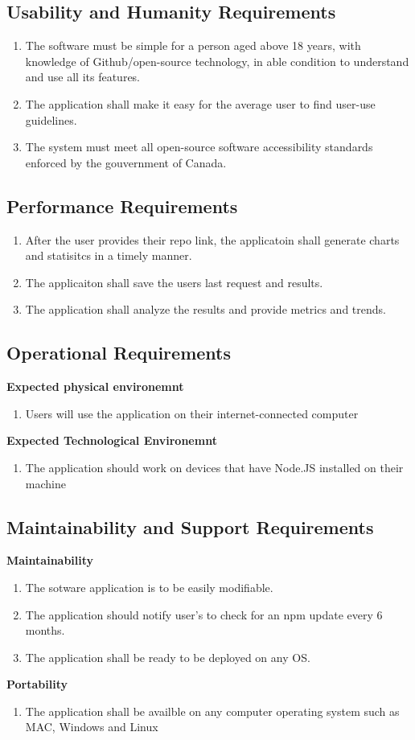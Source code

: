 \documentclass{article}
\begin{document}
\subsection{Usability and Humanity Requirements}
\begin{enumerate}
\item The software must be simple for a person aged above 18 years, with knowledge of Github/open-source technology, in able condition to understand and use all its features.
\item The application shall make it easy for the average user to find user-use guidelines.
\item The system must meet all open-source software accessibility standards enforced by the gouvernment of Canada. 
\end{enumerate}
\subsection{Performance Requirements}
\begin{enumerate}
\item After the user provides their repo link, the applicatoin shall generate charts and statisitcs in a timely manner. 
\item The applicaiton shall save the users last request and results. 
\item The application shall analyze the results and provide metrics and trends. 
\end{enumerate}
\subsection{Operational Requirements}
\textbf{Expected physical environemnt }
\begin{enumerate}
\item Users will use the application on their internet-connected computer 
\end{enumerate}
\textbf{Expected Technological Environemnt }
\begin{enumerate}
\item The application should work on devices that have Node.JS installed on their machine 
\end{enumerate}
\subsection{Maintainability and Support Requirements}
\textbf{Maintainability} 
\begin{enumerate}
\item The sotware application is to be easily modifiable.
\item The application should notify user's to check for an npm update every 6 months. 
\item The application shall be ready to be deployed on any OS. 
\end{enumerate}
\textbf{Portability} 
\begin{enumerate}
\item The application shall be availble on any computer operating system such as MAC, Windows and Linux
\end{enumerate}
\end{document}
